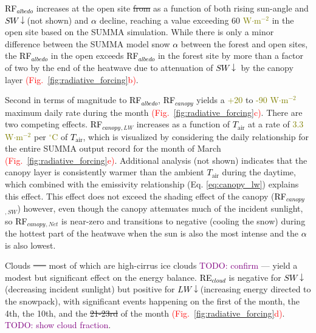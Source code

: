 \documentclass[draft]{agujournal2019}
\newcommand{\fig}[2]{\textcolor{red}{(Fig.~\ref{#1}{#2})}}   %
\newcommand{\todo}[1]{\textcolor{purple}{TODO: #1}}      %
\newcommand{\mynum}[1]{\textcolor{olive}{#1}}
\newcommand{\tair}{\textcolor{black}{$T_{\mathrm{air}}$}\xspace}
\newcommand{\lwdn}{\textcolor{black}{$LW\downarrow$}\xspace}
\newcommand{\swdn}{\textcolor{black}{$SW\downarrow$}\xspace}
\newcommand{\albedo}{\textcolor{black}{$\alpha$}\xspace}
\newcommand{\rfalb}{\textcolor{black}{RF$_{albedo}$}\xspace}
\newcommand{\rfcirrus}{\textcolor{black}{RE$_{cloud}$}\xspace}
\newcommand{\rfcanopy}{\textcolor{black}{RF$_{canopy}$}\xspace}
\newcommand{\wmsq}{\textcolor{olive}{W$\cdot$m$^{-2}$}\xspace}
\newcommand{\degrc}{\textcolor{olive}{$^\circ$C}\xspace}
\providecommand{\DIFadd}[1]{{\protect\color{blue}\uwave{#1}}} %
\providecommand{\DIFdel}[1]{{\protect\color{red}\sout{#1}}}                      %
\providecommand{\DIFaddbegin}{} %
\providecommand{\DIFaddend}{} %
\providecommand{\DIFdelbegin}{} %
\providecommand{\DIFdelend}{} %
\begin{document}
\rfalb increases at the open site \DIFdelbegin \DIFdel{from }\DIFdelend as a function of both rising sun-angle and \swdn (not shown) and \albedo decline, reaching a value exceeding 60 \wmsq in the open site based on the SUMMA simulation.
While there is only a minor difference between the SUMMA model snow \albedo between the forest and open sites, the \rfalb in the open exceeds \rfalb in the forest site by more than a factor of two by the end of the heatwave due to attenuation of \swdn by the canopy layer \fig{fig:radiative_forcing}{b}.


Second in terms of magnitude to \rfalb , \rfcanopy yields a \mynum{+20} to \mynum{-90} \wmsq maximum daily rate during the month \fig{fig:radiative_forcing}{c}.
There are two competing effects.
\rfcanopy$_{,LW}$ increases as a function of \tair at a rate of \mynum{3.3} \wmsq per \degrc of \tair, which is visualized by considering the daily relationship for the entire SUMMA output record for the month of March \fig{fig:radiative_forcing}{e}.
Additional analysis (not shown) indicates that the canopy layer is consistently warmer than the ambient \tair during the daytime, which combined with the emissivity relationship (Eq. \ref{eq:canopy_lw}) explains this effect.
This effect does not exceed the shading effect of the canopy (\rfcanopy$_{,SW}$) however, even though the canopy attenuates much of the incident sunlight, so \rfcanopy$_{,Net}$ is near-zero and transitions to negative (cooling the snow) during the hottest part of the heatwave when the sun is also the most intense and the \albedo is also lowest.

Clouds \DIFdelbegin \DIFdel{—-- }\DIFdelend \DIFaddbegin \DIFadd{--- }\DIFaddend most of which are high-cirrus ice clouds \todo{confirm} --- yield a modest but significant effect on the energy balance.
\rfcirrus is negative for \swdn (decreasing incident sunlight) but positive for \lwdn (increasing energy directed to the snowpack), with significant events happening on the first of the month, the 4th, the 10th, and the \DIFdelbegin \DIFdel{21-23rd }\DIFdelend \DIFaddbegin \DIFadd{21--23rd }\DIFaddend of the month \fig{fig:radiative_forcing}{d}.
\todo{show cloud fraction}.
\end{document}
